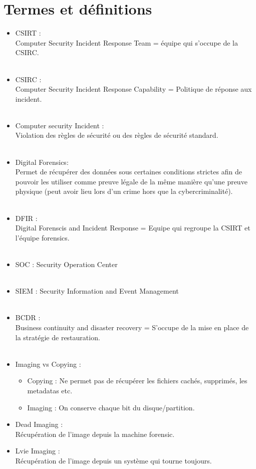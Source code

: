\documentclass[a4paper]{article}
\begin{document}
\section{Termes et définitions}
\begin{itemize}[label=\textbullet, font=\Large]
    \item CSIRT :\\
    Computer Security Incident Response Team = équipe qui s'occupe de la CSIRC.\\\\
    \item CSIRC :\\
    Computer Security Incident Response Capability = Politique de réponse aux incident.\\\\
    \item Computer security Incident :\\
    Violation des règles de sécurité ou des règles de sécurité standard.\\\\
    \item Digital Forensics:\\
    Permet de récupérer des données sous certaines conditions strictes afin de pouvoir les utiliser comme preuve légale de la même manière qu'une preuve physique (peut avoir lieu lors d'un crime hors que la cybercriminalité).\\\\
    \item DFIR :\\
    Digital Forenscis and Incident Response = Equipe qui regroupe la CSIRT et l'équipe forensics.\\\\
    \item SOC : Security Operation Center\\\\
    \item SIEM : Security Information and Event Management\\\\
    \item BCDR :\\Business continuity and disaster recovery = S'occupe de la mise en place de la stratégie de restauration.\\\\
    \item Imaging vs Copying :\\
    \begin{itemize}
        \item Copying : Ne permet pas de récupérer les fichiers cachés, supprimés, les metadatas etc.
        \item Imaging : On conserve chaque bit du disque/partition.
    \end{itemize}
    \item Dead Imaging :\\
    Récupération de l'image depuis la machine forensic.
    \item Lvie Imaging :\\
    Récupération de l'image depuis un système qui tourne toujours.
\end{itemize}
\newpage
\end{document}
